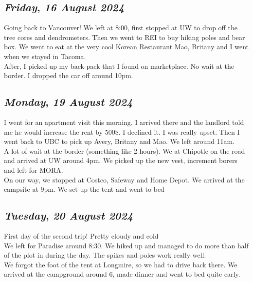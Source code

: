 \def\day{\textit{16 August 2024}}
\def\weekday{\textit{Friday}}
\subsection*{\weekday, \day}
Going back to Vancouver! We left at 8:00, first stopped at UW to drop off the tree cores and dendrometers. Then we went to REI to buy hiking poles and bear box. We went to eat at the very cool Korean Restaurant Mao, Britany and I went when we stayed in Tacoma. \\
After, I picked up my back-pack that I found on marketplace. No wait at the border. I dropped the car off around 10pm. 

\def\day{\textit{19 August 2024}}
\def\weekday{\textit{Monday}}
\subsection*{\weekday, \day}
I went for an apartment visit this morning. I arrived there and the landlord told me he would increase the rent by 500\$. I declined it. I was really upset. Then I went back to UBC to pick up Avery, Britany and Mao. We left around 11am. \\
A lot of wait at the border (something like 2 hours). We at Chipotle on the road and arrived at UW around 4pm. We picked up the new vest, increment borers and left for MORA. \\ 
On our way, we stopped at Costco, Safeway and Home Depot. 
We arrived at the campsite at 9pm. We set up the tent and went to bed

\def\day{\textit{20 August 2024}}
\def\weekday{\textit{Tuesday}}
\subsection*{\weekday, \day}
First day of the second trip! Pretty cloudy and cold\\
We left for Paradise around 8:30. We hiked up and managed to do more than half of the plot in during the day. The spikes and poles work really well.\\
We forgot the foot of the tent at Longmire, so we had to drive back there. We arrived at the campground around 6, made dinner and went to bed quite early.

\def\day{\textit{21 August 2024}}
\def\weekday{\textit{Wednesday}}
